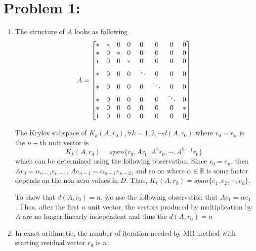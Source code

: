 \section*{Problem 1:}
\begin{enumerate}
\item The structure of $A$ looks as following 
$$
A = 
\setcounter{MaxMatrixCols}{11}
\begin{bmatrix}
* & * & 0 & 0 & 0 & 0 & 0 & 0\\
* & 0 & * & 0 & 0 & 0 & 0 & 0\\
* & 0 & 0 & * & 0 & 0 & 0 & 0\\
* & 0 & 0 & 0 & \ddots & 0 & 0 & 0\\
* & 0 & 0 & 0 & 0 & \ddots & 0 & 0\\
* & 0 & 0 & 0 & 0 & 0 & \ddots & 0\\
* & 0 & 0 & 0 & 0 & 0 & 0 & *\\
1 & 0 & 0 & 0 & 0 & 0 & 0 & 0\\
\end{bmatrix}
$$

The Krylov subspace of $K_{k}(A, r_{0}),  \forall k=1,2,\cdots d(A,r_{0})$ where $r_{0} = e_{n}$ is the $n-$th unit vector is 
$$
K_{k}(A, r_{0}) = span\{r_{0}, Ar_{0}, A^{2}r_{0}, \cdots, A^{k-1}r_{0} \}
$$
which can be determined using the following observation. Since $r_{0} = e_{n}$, then $Ar_{0} = \alpha_{n-1}e_{n-1}$, $Ae_{n-1} = \alpha_{n-1}e_{n-2}$, and so on where $\alpha \in \mathbb{R}$ is some factor depends on the non-zero values in $D$. Thus, $K_{k}(A,r_{0}) = span\{e_{1}, e_{2}, \cdots, e_{k}\}$.

To show that $d(A,r_{0}) = n$, we use the following observation that $Ae_{1} = \alpha e_{1}$. Thus, after the first $n$ unit vector, the vectors produced by multiplication by $A$ are no longer linearly independent and thus the $d(A, r_{0})=n$

\item In exact arithmetic, the number of iteration needed by MR method with starting residual vector $r_{0}$ is $n$. 


\end{enumerate}
